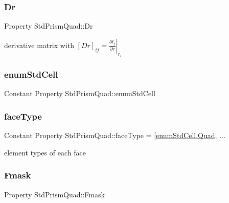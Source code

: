 \subsubsection{\texorpdfstring{Dr}{Dr}}
{\footnotesize\ttfamily Property Std\+Prism\+Quad\+::\+Dr\hspace{0.3cm}{\ttfamily [protected]}}

derivative matrix with $ [Dr]_{ij} = \left.\frac{\partial l_j}{\partial r}\right|_{r_i} $ \mbox{\label{class_std_prism_quad_a8e6acdd1d42d543a6224ed6e58168bd3}} 
\subsubsection{\texorpdfstring{enum\+Std\+Cell}{enumStdCell}}
{\footnotesize\ttfamily Constant Property Std\+Prism\+Quad\+::enum\+Std\+Cell}

\mbox{\label{class_std_prism_quad_a8897f0a9708b5b2162e6d82d8819ea6e}} 
\subsubsection{\texorpdfstring{face\+Type}{faceType}}
{\footnotesize\ttfamily Constant Property Std\+Prism\+Quad\+::face\+Type = \mbox{[}\hyperlink{classenum_std_cell_ac4c2fa4e189e76e103f3ff9b1d19b9e7a79d1c44e78bdfebfd755a724f5e04029}{enum\+Std\+Cell.\+Quad}, ...}



element types of each face 

\mbox{\label{class_std_prism_quad_a649984ecd5ff138a9cb8a0aa6f14be96}} 
\subsubsection{\texorpdfstring{Fmask}{Fmask}}
{\footnotesize\ttfamily Property Std\+Prism\+Quad\+::\+Fmask\hspace{0.3cm}{\ttfamily [protected]}}



